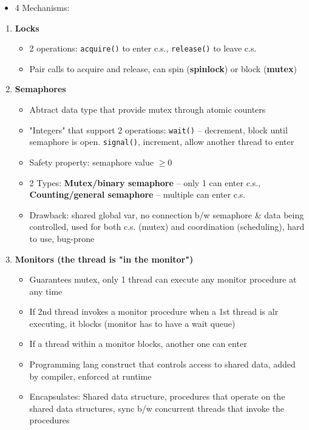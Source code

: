 \documentclass[10pt,landscape,a4paper]{article}
\begin{document}
\begin{multicols*}{4}
\begin{itemize}
\begin{enumerate}
    \end{enumerate}
    \item 4 Mechanisms:
  \end{itemize}
  \begin{enumerate}
    \item \textbf{Locks}
    \begin{itemize}
      \item 2 operations: \texttt{acquire()} to enter c.s., \texttt{release()} to leave c.s.
      \item Pair calls to acquire and release, can spin (\textbf{spinlock}) or block (\textbf{mutex})
    \end{itemize}
    \item \textbf{Semaphores}
    \begin{itemize}
      \item Abtract data type that provide mutex through atomic counters
      \item "Integers" that support 2 operations: \texttt{wait()} -- decrement, block until semaphore is open. \texttt{signal()}, increment, allow another thread to enter
      \item Safety property: semaphore value $\geq 0$
      \item 2 Types: \textbf{Mutex/binary semaphore} -- only 1 can enter c.s., \textbf{Counting/general semaphore} -- multiple can enter c.s.
      \item Drawback: shared global var, no connection b/w semaphore \& data being controlled, used for both c.s. (mutex) and coordination (scheduling), hard to use, bug-prone
    \end{itemize}
    \item \textbf{Monitors \textmd{(the thread is "in the monitor")}}
    \begin{itemize}
      \item Guarantees mutex, only 1 thread can execute any monitor procedure at any time
      \item If 2nd thread invokes a monitor procedure when a 1st thread is alr executing, it blocks (monitor has to have a wait queue)
      \item If a thread within a monitor blocks, another one can enter
      \item Programming lang construct that controls access to shared data, added by compiler, enforced at runtime
      \item Encapsulates: Shared data structure, procedures that operate on the shared data structures, sync b/w concurrent threads that invoke the procedures

\end{itemize}
\end{enumerate}
\end{multicols*}
\end{document}
